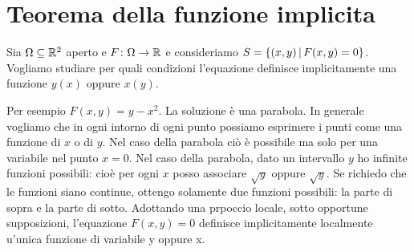 \documentclass[a4paper]{article}
\begin{document}
\pagebreak

\section{Teorema della funzione implicita}

Sia \(\Omega \subseteq \mathbb{R}^2\) aperto e \(F\colon \Omega \to \mathbb{R}\)
e consideriamo \(S = \{(x,y) \,|\, F(x,y) = 0\}\).
Vogliamo studiare per quali condizioni
l'equazione definisce implicitamente una funzione \(y(x)\)
oppure \(x(y)\).


Per esempio \(F(x,y) = y - x^2\). La soluzione è una parabola.
In generale vogliamo che in ogni intorno di ogni punto possiamo
esprimere i punti come una funzione di \(x\) o di \(y\).
Nel caso della parabola ciò è possibile ma solo per una variabile
nel punto \(x=0\).
Nel caso della parabola, dato un intervallo \(y\) ho infinite funzioni possibili:
cioè per ogni \(x\) posso associare \(\sqrt{y}\) oppure \(\sqrt{y}\).
Se richiedo che le funzioni siano continue, ottengo solamente due funzioni possibili:
la parte di sopra e la parte di sotto.
Adottando una prpoccio locale, sotto opportune supposizioni,
l'equazione \(F(x,y) = 0\) definisce implicitamente
localmente u'unica funzione di variabile y oppure x.



\end{document}
